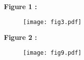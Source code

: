 \documentclass{article}
\begin{document}
\newpage\textbf{Figure 1 : }
\begin{center}
 \begin{figure}[h!]
 \texttt{[image: fig3.pdf]}\label{fig:fig3}
 \end{figure}
 \end{center}
\clearpage 
\textbf{Figure 2 : }
\begin{center}
 \begin{figure}[h!]
 \texttt{[image: fig9.pdf]}\label{fig:fig9}
 \end{figure}
 \end{center}
\clearpage 
\end{document}
